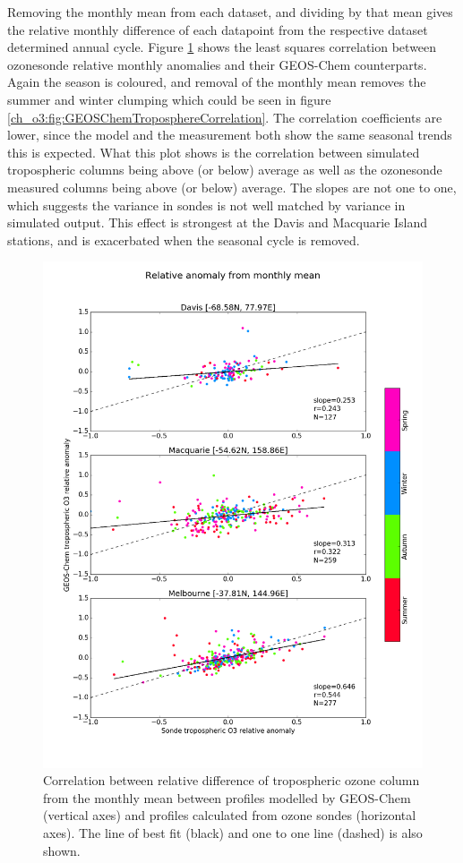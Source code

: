     Removing the monthly mean from each dataset, and dividing by that mean gives the relative monthly difference of each datapoint from the respective dataset determined annual cycle.
    Figure \ref{ch_o3:fig:GEOSChemTroposphereCorrelationAnomalies} shows the least squares correlation between ozonesonde relative monthly anomalies and their GEOS-Chem counterparts.
    Again the season is coloured, and removal of the monthly mean removes the summer and winter clumping which could be seen in figure \ref{ch_o3:fig:GEOSChemTroposphereCorrelation}.
    The correlation coefficients are lower, since the model and the measurement both show the same seasonal trends this is expected.
    What this plot shows is the correlation between simulated tropospheric columns being above (or below) average as well as the ozonesonde measured columns being above (or below) average.
    The slopes are not one to one, which suggests the variance in sondes is not well matched by variance in simulated output.
    This effect is strongest at the Davis and Macquarie Island stations, and is exacerbated when the seasonal cycle is removed.
    
    \begin{figure}[!htbp]
      \includegraphics[width=\textwidth]{Figures/Ozone/station_correlations_anomalies.png}
      \caption{Correlation between relative difference of tropospheric ozone column from the monthly mean between profiles modelled by GEOS-Chem (vertical axes) and profiles calculated from ozone sondes (horizontal axes). 
      The line of best fit (black) and one to one line (dashed) is also shown.}
      \label{ch_o3:fig:GEOSChemTroposphereCorrelationAnomalies}
    \end{figure}
    
